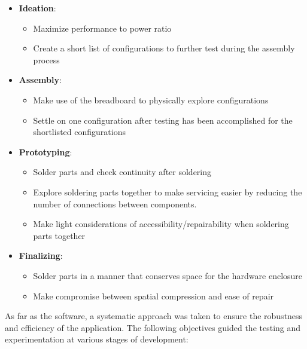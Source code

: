\documentclass[conference]{IEEEtran}
\begin{document}
\begin{itemize}
      \item \textbf{Ideation}:
            \begin{itemize}
                  \item Maximize performance to power ratio
                  \item Create a short list of configurations to further test
                        during the assembly process
            \end{itemize}
      \item \textbf{Assembly}:
            \begin{itemize}
                  \item Make use of the breadboard to physically explore configurations
                  \item Settle on one configuration after testing has been
                        accomplished for the shortlisted configurations
            \end{itemize}
      \item \textbf{Prototyping}:
            \begin{itemize}
                  \item Solder parts and check continuity after soldering
                  \item Explore soldering parts together to make servicing easier
                        by reducing the number of connections between components.
                  \item Make light considerations of accessibility/repairability when soldering parts together
            \end{itemize}
      \item \textbf{Finalizing}:
            \begin{itemize}
                  \item Solder parts in a manner that conserves space for the hardware enclosure
                  \item Make compromise between spatial compression and ease of repair
            \end{itemize}
\end{itemize}

As far as the software, a systematic approach was taken to ensure the
robustness and efficiency of the application. The following objectives
guided the testing and experimentation at various stages of development:
\end{document}
